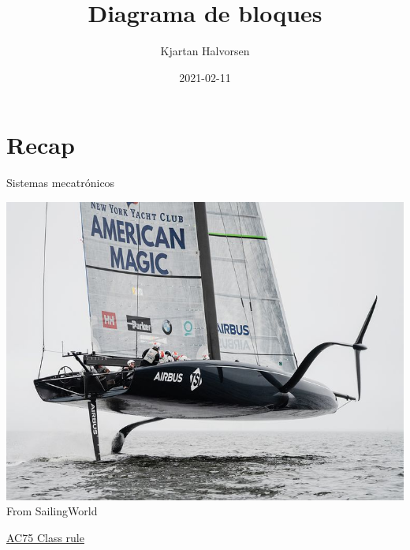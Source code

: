 \documentclass[presentation,aspectratio=169]{beamer}
\author{Kjartan Halvorsen}
\date{2021-02-11}
\title{Diagrama de bloques}
\begin{document}
\maketitle

\section{Recap}
\label{sec:orgc132a6a}
\begin{frame}[label={sec:org7ae6403}]{Sistemas mecatrónicos}
\begin{center}
\includegraphics[height=0.7\textheight]{../../figures/ac75.jpeg}\\
{\footnotesize  From SailingWorld}
\end{center}

\href{https://www.sailingscuttlebutt.com/wp-content/uploads/2018/03/AC75\_Class\_Rule.pdf}{AC75 Class rule}
\end{frame}
\end{document}
